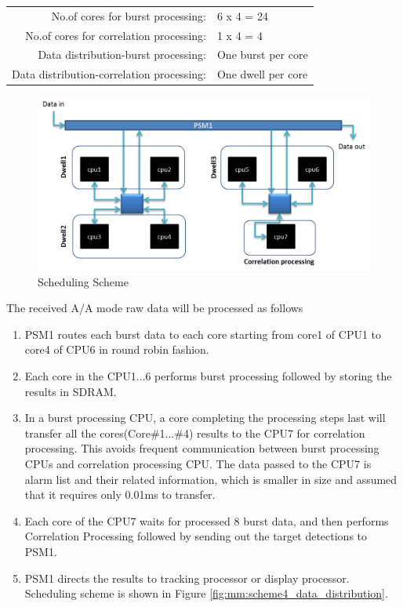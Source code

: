 \begin{tabular}{rl}
	No.of cores for burst processing: & 6 x 4 = 24 \\
	No.of cores for correlation processing: & 1 x 4 = 4 \\
	Data distribution-burst processing: & One burst per core \\
	Data distribution-correlation processing: & One dwell per core \\
\end{tabular}

\begin{figure}[h!]
	\centering
	\includegraphics[width=140mm]{figures/scheme4_aa_mode_mapping}
	\caption{Scheduling Scheme}
	\label{fig:mm:scheme4_aa_mode_mapping}
\end{figure}

\vspace*{0.2cm}
\noindent
The received A/A mode raw data will be processed as follows

\begin{enumerate}
\item PSM1 routes each burst data to each core starting from core1 of CPU1 to core4 of CPU6 in round robin fashion.
\item Each core in the CPU1...6 performs burst processing followed by storing the results in SDRAM.
\item In a burst processing CPU, a core completing the processing steps last will transfer all the cores(Core\#1...\#4) results to the CPU7 for correlation processing. This avoids frequent communication between burst processing CPUs and correlation processing CPU. The data passed to the CPU7 is alarm list and their related information, which is smaller in size and assumed that it requires only 0.01ms to transfer.
\item Each core of the CPU7 waits for processed 8 burst data, and then performs Correlation Processing followed by sending out the target detections to PSM1.
\item PSM1 directs the results to tracking processor or display processor. Scheduling scheme is shown in Figure \ref{fig:mm:scheme4_data_distribution}.
\end{enumerate}


